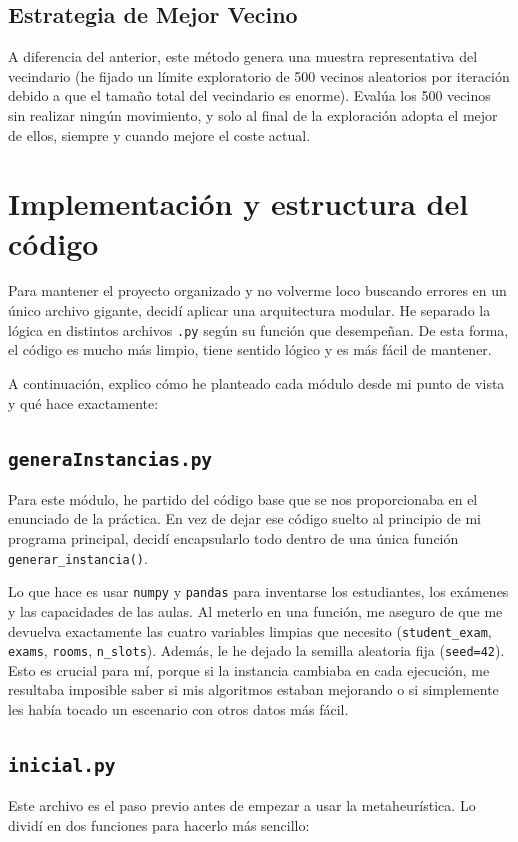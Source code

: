 \documentclass[12pt]{article}
\begin{document}
\subsection{Estrategia de Mejor Vecino}
A diferencia del anterior, este método genera una muestra representativa del vecindario (he fijado un límite exploratorio de 500 vecinos aleatorios por iteración debido a que el tamaño total del vecindario es enorme). Evalúa los 500 vecinos sin realizar ningún movimiento, y solo al final de la exploración adopta el mejor de ellos, siempre y cuando mejore el coste actual.

\section{Implementación y estructura del código}
Para mantener el proyecto organizado y no volverme loco buscando errores en un único archivo gigante, decidí aplicar una arquitectura modular. He separado la lógica en distintos archivos \texttt{.py} según su función que desempeñan. De esta forma, el código es mucho más limpio, tiene sentido lógico y es más fácil de mantener.

A continuación, explico cómo he planteado cada módulo desde mi punto de vista y qué hace exactamente:

\subsection{\texttt{generaInstancias.py}}
Para este módulo, he partido del código base que se nos proporcionaba en el enunciado de la práctica. En vez de dejar ese código suelto al principio de mi programa principal, decidí encapsularlo todo dentro de una única función \texttt{generar\_instancia()}.

Lo que hace es usar \texttt{numpy} y \texttt{pandas} para inventarse los estudiantes, los exámenes y las capacidades de las aulas. Al meterlo en una función, me aseguro de que me devuelva exactamente las cuatro variables limpias que necesito (\texttt{student\_exam}, \texttt{exams}, \texttt{rooms}, \texttt{n\_slots}). Además, le he dejado la semilla aleatoria fija (\texttt{seed=42}). Esto es crucial para mí, porque si la instancia cambiaba en cada ejecución, me resultaba imposible saber si mis algoritmos estaban mejorando o si simplemente les había tocado un escenario con otros datos más fácil.

\subsection{\texttt{inicial.py}}
Este archivo es el paso previo antes de empezar a usar la metaheurística. Lo dividí en dos funciones para hacerlo más sencillo:
\end{document}

